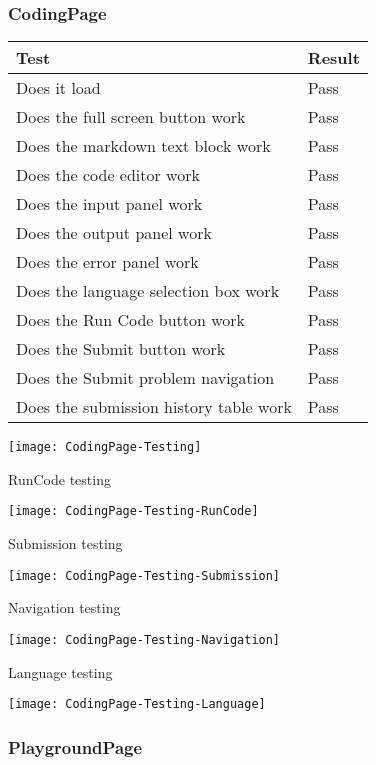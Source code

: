 \documentclass[report.tex]{subfiles}
\begin{document}
\subsubsection{CodingPage}

\begin{tabulary}{\linewidth}{|L|l|}
    \hline
    Test & Result \\
    \hline
    Does it load & Pass \\
    \hline
    Does the full screen button work & Pass \\
    \hline
    Does the markdown text block work & Pass \\
    \hline
    Does the code editor work & Pass \\
    \hline
    Does the input panel work & Pass \\
    \hline
    Does the output panel work & Pass \\
    \hline
    Does the error panel work & Pass \\
    \hline
    Does the language selection box work & Pass \\
    \hline
    Does the Run Code button work & Pass \\
    \hline
    Does the Submit button work & Pass \\
    \hline
    Does the Submit problem navigation & Pass \\
    \hline
    Does the submission history table work & Pass \\
    \hline
\end{tabulary}

\texttt{[image: CodingPage-Testing]}

RunCode testing

\texttt{[image: CodingPage-Testing-RunCode]}

Submission testing

\texttt{[image: CodingPage-Testing-Submission]}

Navigation testing

\texttt{[image: CodingPage-Testing-Navigation]}

Language testing

\texttt{[image: CodingPage-Testing-Language]}

\subsubsection{PlaygroundPage}
\end{document}

